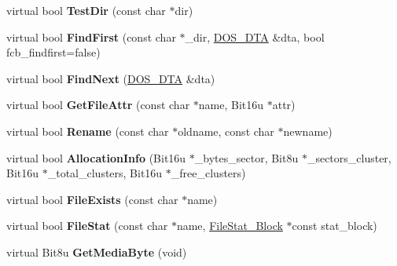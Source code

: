 \begin{DoxyCompactItemize}
\item 
\hypertarget{classlocalDrive_acb08978e0c5cfa975033f33738ac1ed0}{virtual bool {\bfseries Test\-Dir} (const char $\ast$dir)}\label{classlocalDrive_acb08978e0c5cfa975033f33738ac1ed0}

\item 
\hypertarget{classlocalDrive_aa458c60b026b79e8e6e0c9247c4eb1ff}{virtual bool {\bfseries Find\-First} (const char $\ast$\-\_\-dir, \hyperlink{classDOS__DTA}{D\-O\-S\-\_\-\-D\-T\-A} \&dta, bool fcb\-\_\-findfirst=false)}\label{classlocalDrive_aa458c60b026b79e8e6e0c9247c4eb1ff}

\item 
\hypertarget{classlocalDrive_ad76629b03e06dd8f2fe5bde5458a81fb}{virtual bool {\bfseries Find\-Next} (\hyperlink{classDOS__DTA}{D\-O\-S\-\_\-\-D\-T\-A} \&dta)}\label{classlocalDrive_ad76629b03e06dd8f2fe5bde5458a81fb}

\item 
\hypertarget{classlocalDrive_a60a489b8d435065127281ed28f5d74cc}{virtual bool {\bfseries Get\-File\-Attr} (const char $\ast$name, Bit16u $\ast$attr)}\label{classlocalDrive_a60a489b8d435065127281ed28f5d74cc}

\item 
\hypertarget{classlocalDrive_ac734204b365b747fc90a50a00c8540ae}{virtual bool {\bfseries Rename} (const char $\ast$oldname, const char $\ast$newname)}\label{classlocalDrive_ac734204b365b747fc90a50a00c8540ae}

\item 
\hypertarget{classlocalDrive_abc95b6539cb6e9e1d59362af64fc0426}{virtual bool {\bfseries Allocation\-Info} (Bit16u $\ast$\-\_\-bytes\-\_\-sector, Bit8u $\ast$\-\_\-sectors\-\_\-cluster, Bit16u $\ast$\-\_\-total\-\_\-clusters, Bit16u $\ast$\-\_\-free\-\_\-clusters)}\label{classlocalDrive_abc95b6539cb6e9e1d59362af64fc0426}

\item 
\hypertarget{classlocalDrive_a0ef1536b3b43bdc29c1aa8054109e9bf}{virtual bool {\bfseries File\-Exists} (const char $\ast$name)}\label{classlocalDrive_a0ef1536b3b43bdc29c1aa8054109e9bf}

\item 
\hypertarget{classlocalDrive_a3345badc73c852a8265093936960b16d}{virtual bool {\bfseries File\-Stat} (const char $\ast$name, \hyperlink{structFileStat__Block}{File\-Stat\-\_\-\-Block} $\ast$const stat\-\_\-block)}\label{classlocalDrive_a3345badc73c852a8265093936960b16d}

\item 
\hypertarget{classlocalDrive_abe537418d01f04b3f3568a13d8a2c792}{virtual Bit8u {\bfseries Get\-Media\-Byte} (void)}\label{classlocalDrive_abe537418d01f04b3f3568a13d8a2c792}


\end{DoxyCompactItemize}
